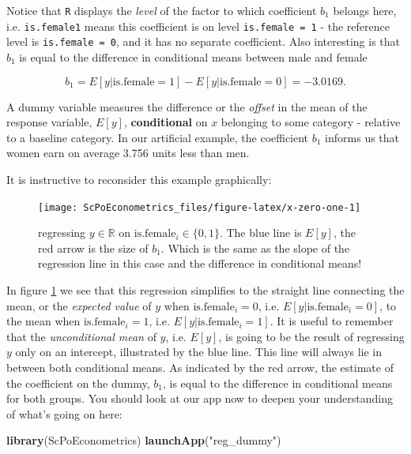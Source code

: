 \documentclass[]{book}
\newenvironment{Shaded}{\begin{snugshade}}{\end{snugshade}}
\newcommand{\KeywordTok}[1]{\textcolor[rgb]{0.13,0.29,0.53}{\textbf{#1}}}
\newcommand{\NormalTok}[1]{#1}
\newcommand{\StringTok}[1]{\textcolor[rgb]{0.31,0.60,0.02}{#1}}
\newenvironment{note}{\begin{tcolorbox}[colback=blue!5!white,colframe=blue!75!black]}{\end{tcolorbox}}
\begin{document}
Notice that \texttt{R} displays the \emph{level} of the factor to which coefficient \(b_1\) belongs here, i.e. \texttt{is.female1} means this coefficient is on level \texttt{is.female\ =\ 1} - the reference level is \texttt{is.female\ =\ 0}, and it has no separate coefficient. Also interesting is that \(b_1\) is equal to the difference in conditional means between male and female

\[b_1 = E[y|\text{is.female}=1] - E[y|\text{is.female}=0]=-3.0169.\]

\begin{note}
A dummy variable measures the difference or the \emph{offset} in the
mean of the response variable, \(E[y]\), \textbf{conditional} on \(x\)
belonging to some category - relative to a baseline category. In our
artificial example, the coefficient \(b_1\) informs us that women earn
on average 3.756 units less than men.
\end{note}

It is instructive to reconsider this example graphically:

\begin{figure}

{\centering \texttt{[image: ScPoEconometrics\_files/figure-latex/x-zero-one-1]} 

}

\caption{regressing $y \in \mathbb{R}$ on $\text{is.female}_i \in \{0,1\}$. The blue line is $E[y]$, the red arrow is the size of $b_1$. Which is the same as the slope of the regression line in this case and the difference in conditional means!}\label{fig:x-zero-one}
\end{figure}

In figure \ref{fig:x-zero-one} we see that this regression simplifies to the straight line connecting the mean, or the \emph{expected value} of \(y\) when \(\text{is.female}_i = 0\), i.e. \(E[y|\text{is.female}_i=0]\), to the mean when \(\text{is.female}_i=1\), i.e. \(E[y|\text{is.female}_i=1]\). It is useful to remember that the \emph{unconditional mean} of \(y\), i.e. \(E[y]\), is going to be the result of regressing \(y\) only on an intercept, illustrated by the blue line. This line will always lie in between both conditional means. As indicated by the red arrow, the estimate of the coefficient on the dummy, \(b_1\), is equal to the difference in conditional means for both groups. You should look at our app now to deepen your understanding of what's going on here:

\begin{Shaded}
\begin{Highlighting}[]
\KeywordTok{library}\NormalTok{(ScPoEconometrics)}
\KeywordTok{launchApp}\NormalTok{(}\StringTok{"reg_dummy"}\NormalTok{)}
\end{Highlighting}
\end{Shaded}
\end{document}
